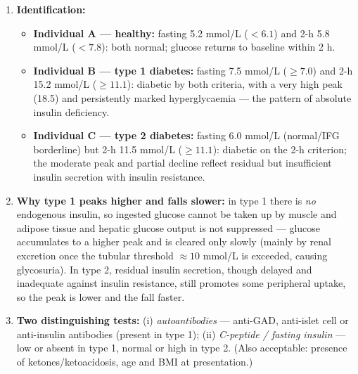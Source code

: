 \documentclass[11pt]{article}
\begin{document}
\begin{corrige}
\begin{enumerate}
\item \textbf{Identification:}
\begin{itemize}
\item \textbf{Individual A — healthy:} fasting 5.2 mmol/L ($<6.1$) and 2-h 5.8 mmol/L ($<7.8$): both normal; glucose returns to baseline within 2 h.
\item \textbf{Individual B — type 1 diabetes:} fasting 7.5 mmol/L ($\ge 7.0$) and 2-h 15.2 mmol/L ($\ge 11.1$): diabetic by both criteria, with a very high peak (18.5) and persistently marked hyperglycaemia — the pattern of absolute insulin deficiency.
\item \textbf{Individual C — type 2 diabetes:} fasting 6.0 mmol/L (normal/IFG borderline) but 2-h 11.5 mmol/L ($\ge 11.1$): diabetic on the 2-h criterion; the moderate peak and partial decline reflect residual but insufficient insulin secretion with insulin resistance.
\end{itemize}
\item \textbf{Why type 1 peaks higher and falls slower:} in type 1 there is \emph{no} endogenous insulin, so ingested glucose cannot be taken up by muscle and adipose tissue and hepatic glucose output is not suppressed — glucose accumulates to a higher peak and is cleared only slowly (mainly by renal excretion once the tubular threshold $\approx 10$ mmol/L is exceeded, causing glycosuria). In type 2, residual insulin secretion, though delayed and inadequate against insulin resistance, still promotes some peripheral uptake, so the peak is lower and the fall faster.
\item \textbf{Two distinguishing tests:} (i) \emph{autoantibodies} — anti-GAD, anti-islet cell or anti-insulin antibodies (present in type 1); (ii) \emph{C-peptide / fasting insulin} — low or absent in type 1, normal or high in type 2. (Also acceptable: presence of ketones/ketoacidosis, age and BMI at presentation.)
\end{enumerate}
\end{corrige}
\end{document}
